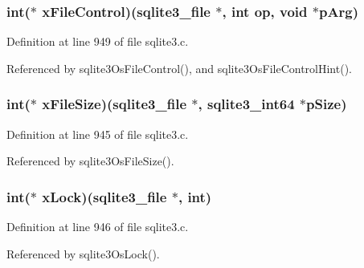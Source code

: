 \subsubsection[{x\+File\+Control}]{\setlength{\rightskip}{0pt plus 5cm}int($\ast$ x\+File\+Control)({\bf sqlite3\+\_\+file} $\ast$, int op, void $\ast$p\+Arg)}\label{structsqlite3__io__methods_a6ef23eda890920cc3fe586fc9ef1f7b1}


Definition at line 949 of file sqlite3.\+c.



Referenced by sqlite3\+Os\+File\+Control(), and sqlite3\+Os\+File\+Control\+Hint().

\hypertarget{structsqlite3__io__methods_ab64f72852b709be630716b073ee18d81}{}
\subsubsection[{x\+File\+Size}]{\setlength{\rightskip}{0pt plus 5cm}int($\ast$ x\+File\+Size)({\bf sqlite3\+\_\+file} $\ast$, {\bf sqlite3\+\_\+int64} $\ast$p\+Size)}\label{structsqlite3__io__methods_ab64f72852b709be630716b073ee18d81}


Definition at line 945 of file sqlite3.\+c.



Referenced by sqlite3\+Os\+File\+Size().

\hypertarget{structsqlite3__io__methods_aa2fca6e81fd5d6a66a0d301014634e8c}{}
\subsubsection[{x\+Lock}]{\setlength{\rightskip}{0pt plus 5cm}int($\ast$ x\+Lock)({\bf sqlite3\+\_\+file} $\ast$, int)}\label{structsqlite3__io__methods_aa2fca6e81fd5d6a66a0d301014634e8c}


Definition at line 946 of file sqlite3.\+c.



Referenced by sqlite3\+Os\+Lock().

\hypertarget{structsqlite3__io__methods_afd9c9bd674df251d9fc83fe3c9264e49}{}

